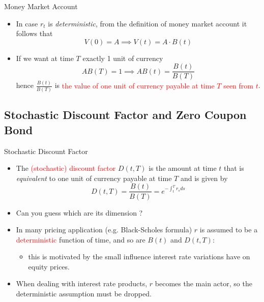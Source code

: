 \documentclass{beamer}
\begin{document}
\begin{frame}{Money Market Account}
	\begin{itemize}
		\item In case $r_t$ is \emph{deterministic}, from the definition of money market account it follows that 
		\begin{equation*}
			V(0) = A \implies V(t) = A\cdot B(t)
		\end{equation*}
		\item If we want at time $T$ exactly 1 unit of currency
		\begin{equation*}
			AB(T) = 1 \implies AB(t) = \frac{B(t)}{B(T)} 
		\end{equation*}
		hence $\frac{B(t)}{B(T)}$ is \textcolor{red}{the value of one unit of currency payable at time $T$ seen from $t$}.
		
	\end{itemize}
\end{frame}

\subsection{Stochastic Discount Factor and Zero Coupon Bond}
\begin{frame}{Stochastic Discount Factor}
	\begin{itemize}
		\item The \textcolor{red}{(stochastic) discount factor} $D(t, T)$ is the amount at time $t$ that is \emph{equivalent} to one unit of currency payable at time $T$ and is given by
		\begin{equation}
			D(t, T) = \frac{B(t)}{B(T)} = e^{-\int_t^T r_s ds}
		\end{equation}
		\item Can you guess which are its dimension ?	
		\item In many pricing application (e.g. Black-Scholes formula) $r$ is assumed to be a \textcolor{red}{deterministic} function of time, and so are $B(t)$ and $D(t,T)$:
		\begin{itemize}
			\item this is motivated by the small influence interest rate variations have on equity prices.
		\end{itemize}
		\item When dealing with interest rate products, $r$ becomes the main actor, so the deterministic assumption must be dropped.
	\end{itemize}	
\end{frame}
\end{document}
